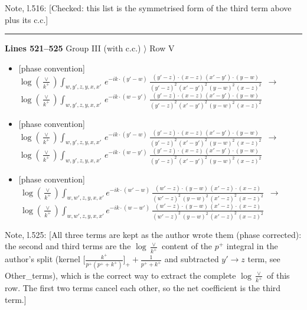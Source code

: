 \documentclass[10pt]{article}
\newenvironment{notebox}{\def\FrameCommand{{\color{notebar}\vrule width 1.5pt}\hspace{6pt}}\MakeFramed{\advance\hsize-\width\FrameRestore}\small}{\endMakeFramed}
\begin{document}
\begin{notebox}\textsf{\small Note, l.516:} [Checked: this list is the symmetrised form of the third term above plus its c.c.]\end{notebox}
\noindent\rule{\linewidth}{0.3pt}\par\noindent\textbf{Lines 521--525} \quad \textsf{Group III (with c.c.) $\rangle$ Row V} \par
\begin{itemize}[leftmargin=2.2em,itemsep=1pt,topsep=2pt]
\item[\textbf{l.521}] \textsf{\small [phase convention]} $\displaystyle \log{(\frac{\vee}{k^{+}})} \int_{w,y',z,y,x,x'}\, e^{-ik\cdot (y'-w)}\,\frac{(y'-z)\cdot (x-z)\,(x'-y')\cdot (y-w)}{(y'-z)^{2}\,(x'-y')^{2}\,(y-w)^{2}\,(x-z)^{2}}$\ $\longrightarrow$\ $\displaystyle \log{(\frac{\vee}{k^{+}})} \int_{w,y',z,y,x,x'}\, e^{-ik\cdot (w-y')}\,\frac{(y'-z)\cdot (x-z)\,(x'-y')\cdot (y-w)}{(y'-z)^{2}\,(x'-y')^{2}\,(y-w)^{2}\,(x-z)^{2}}$
\item[\textbf{l.522}] \textsf{\small [phase convention]} $\displaystyle \log{(\frac{\vee}{k^{+}})} \int_{w,y',z,y,x,x'}\, e^{-ik\cdot (y'-w)}\,\frac{(y'-z)\cdot (x-z)\,(x'-y')\cdot (y-w)}{(y'-z)^{2}\,(x'-y')^{2}\,(y-w)^{2}\,(x-z)^{2}}$\ $\longrightarrow$\ $\displaystyle \log{(\frac{\vee}{k^{+}})} \int_{w,y',z,y,x,x'}\, e^{-ik\cdot (w-y')}\,\frac{(y'-z)\cdot (x-z)\,(x'-y')\cdot (y-w)}{(y'-z)^{2}\,(x'-y')^{2}\,(y-w)^{2}\,(x-z)^{2}}$
\item[\textbf{l.523}] \textsf{\small [phase convention]} $\displaystyle \,\log{(\frac{\vee}{k^{+}})}\int_{w,w',z,y,x,x'} e^{-ik\cdot (w'-w)}\,\frac{(w'-z)\cdot (y-w)\,(x'-z)\cdot (x-z)}{(w'-z)^{2}\,(y-w)^{2}\,(x'-z)^{2}\,(x-z)^{2}}$\ $\longrightarrow$\ $\displaystyle \,\log{(\frac{\vee}{k^{+}})}\int_{w,w',z,y,x,x'} e^{-ik\cdot (w-w')}\,\frac{(w'-z)\cdot (y-w)\,(x'-z)\cdot (x-z)}{(w'-z)^{2}\,(y-w)^{2}\,(x'-z)^{2}\,(x-z)^{2}}$
\end{itemize}
\begin{notebox}\textsf{\small Note, l.525:} [All three terms are kept as the author wrote them (phase corrected): the second and third terms are the $\log\frac{\vee}{k^{+}}$ content of the $p^{+}$ integral in the author's split (kernel $\big[\frac{k^{+}}{p^{+}(p^{+}+k^{+})}\big]_{+}+\frac{1}{p^{+}+k^{+}}$ and subtracted $y'\to z$ term, see Other\_terms), which is the correct way to extract the complete $\log\frac{\vee}{k^{+}}$ of this row. The first two terms cancel each other, so the net coefficient is the third term.]\end{notebox}
\end{document}
